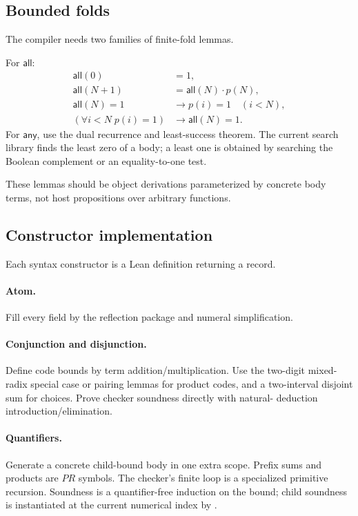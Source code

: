 \subsection{Bounded folds}

The compiler needs two families of finite-fold lemmas.

For \(\mathsf{all}\):
\begin{align*}
 \mathsf{all}(0)&=1,\\
 \mathsf{all}(N+1)&=\mathsf{all}(N)\cdot p(N),\\
 \mathsf{all}(N)=1&\to p(i)=1\quad(i<N),\\
 (\forall i<N\;p(i)=1)&\to\mathsf{all}(N)=1.
\end{align*}
For \(\mathsf{any}\), use the dual recurrence and least-success theorem.  The
current search library finds the least zero of a body; a least one is obtained
by searching the Boolean complement or an equality-to-one test.

These lemmas should be object derivations parameterized by concrete body terms,
not host propositions over arbitrary functions.

\subsection{Constructor implementation}

Each syntax constructor is a Lean definition returning a
 record.

\paragraph{Atom.}
Fill every field by the reflection package and numeral simplification.

\paragraph{Conjunction and disjunction.}
Define code bounds by term addition/multiplication.  Use the two-digit
mixed-radix special case or pairing lemmas for product codes, and a two-interval
disjoint sum for choices.  Prove checker soundness directly with natural-
deduction introduction/elimination.

\paragraph{Quantifiers.}
Generate a concrete child-bound body in one extra scope.  Prefix sums and
products are \(PR\) symbols.  The checker's finite loop is a specialized
primitive recursion.  Soundness is a quantifier-free induction on the bound;
child soundness is instantiated at the current numerical index by
.

